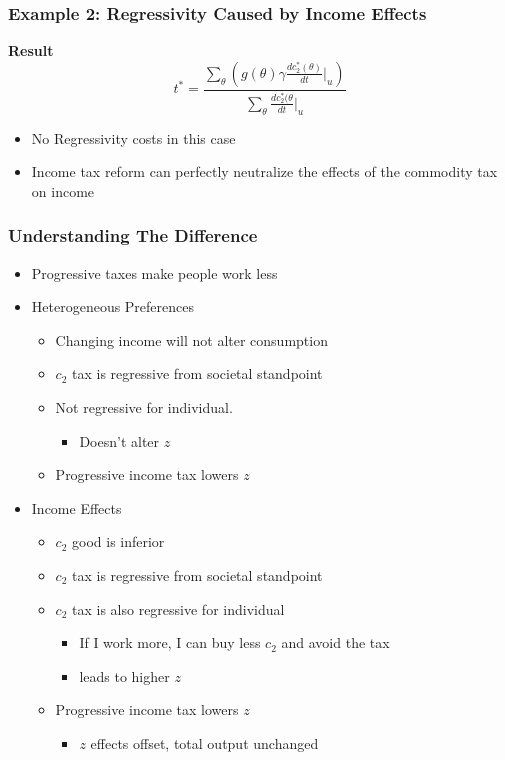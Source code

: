\documentclass{beamer}
\begin{document}
\begin{frame}
\frametitle{Example 2: Regressivity Caused by Income Effects }

\textbf{Result}
$$
t^* =  \frac{\sum_{\theta}^{} \left( g(\theta)\gamma\frac{dc_2^*(\theta)}{dt} \biggr\rvert_{u} \right)}{\sum_{\theta}\frac{dc_2^*(\theta}{dt} \biggr\rvert_{u}}
$$

\begin{itemize}

\item No Regressivity costs in this case
\item  Income tax reform can perfectly neutralize the effects of the commodity tax on income

\end{itemize}
\end{frame}

\begin{frame}
\frametitle{Understanding The Difference}

\begin{itemize}
	\item Progressive taxes make people work less
	\item Heterogeneous Preferences 
	\begin{itemize}
		\item Changing income will not alter consumption 
		\item $c_2$ tax is regressive from societal standpoint 
		\item Not regressive for individual.
		\begin{itemize}
			\item Doesn't alter $z$
		\end{itemize} 
		\item Progressive income tax lowers $z$
	\end{itemize}
	\item Income Effects 
	\begin{itemize}
		\item $c_2$ good is inferior
		\item $c_2$ tax is regressive from societal standpoint 
		\item $c_2$ tax is also regressive for individual
		\begin{itemize}
			\item If I work more, I can buy less $c_2$ and avoid the tax 
			\item leads to higher $z$
		\end{itemize}
	
		\item Progressive income tax lowers $z$
		\begin{itemize}
			\item $z$ effects offset, total output unchanged 
		\end{itemize}
	\end{itemize}

\end{itemize}


\end{frame}
\end{document}
